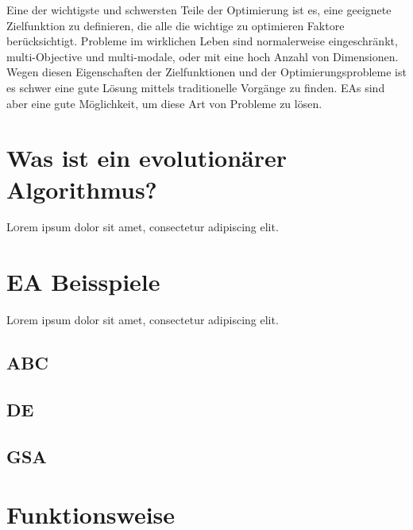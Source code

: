 \documentclass[twoside,twocolumn]{article}
\begin{document}
Eine der wichtigste und schwersten Teile der Optimierung ist es, eine geeignete Zielfunktion zu definieren, die alle die wichtige zu optimieren Faktore berücksichtigt.
Probleme im wirklichen Leben sind normalerweise eingeschränkt, multi-Objective und multi-modale, oder mit eine hoch Anzahl von Dimensionen. Wegen diesen Eigenschaften der Zielfunktionen und der Optimierungsprobleme ist es schwer eine gute Lösung mittels traditionelle Vorgänge  zu finden. EAs sind aber eine gute Möglichkeit, um diese Art von Probleme zu lösen.

\section{Was ist ein evolutionärer Algorithmus?}

\lettrine[nindent=0em,lines=3]{L} orem ipsum dolor sit amet, consectetur adipiscing elit.
\blindtext %

\blindtext %


\section{EA Beisspiele}

\lettrine[nindent=0em,lines=3]{L} orem ipsum dolor sit amet, consectetur adipiscing elit.
\blindtext %

\subsection{ABC}
\blindtext %

\subsection{DE}
\blindtext %

\subsection{GSA}
\blindtext %

\blindtext %


\section{Funktionsweise}
\end{document}
